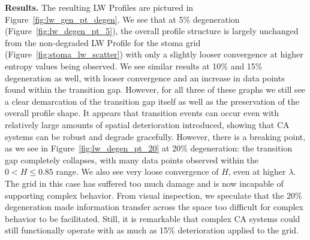 \documentclass[a4paper,11pt]{article}
\begin{document}
\medskip

\noindent \textbf{Results.} The resulting LW Profiles are pictured in Figure~\ref{fig:lw_gen_pt_degen}. We see that at 5\% degeneration (Figure~\ref{fig:lw_degen_pt_5}), the overall profile structure is largely unchanged from the non-degraded LW Profile for the stoma grid (Figure~\ref{fig:stoma_lw_scatter}) with only a slightly looser convergence at higher entropy values being observed. We see similar results at 10\% and 15\% degeneration as well, with looser convergence and an increase in data points found within the transition gap. However, for all three of these graphs we still see a clear demarcation of the transition gap itself as well as the preservation of the overall profile shape. It appears that transition events can occur even with relatively large amounts of spatial deterioration introduced, showing that CA systems can be robust and degrade gracefully. However, there is a breaking point, as we see in Figure~\ref{fig:lw_degen_pt_20} at 20\% degeneration: the transition gap completely collapses, with many data points observed within the $0 < H \le 0.85$ range. We also see very loose convergence of $H$, even at higher $\lambda$. The grid in this case has suffered too much damage and is now incapable of supporting complex behavior. From visual inspection, we speculate that the 20\% degeneration made information transfer across the space too difficult for complex behavior to be facilitated. Still, it is remarkable that complex CA systems could still functionally operate with as much as 15\% deterioration applied to the grid.
\end{document}

